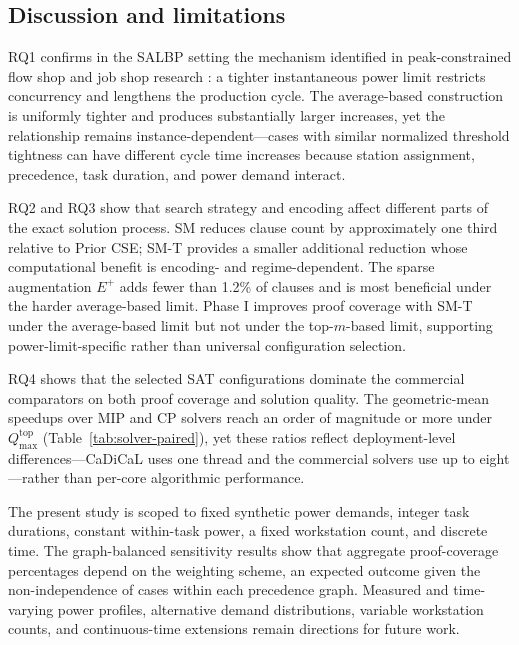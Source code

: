 \documentclass[]{interact}
\theoremstyle{plain}
\theoremstyle{definition}
\theoremstyle{remark}
\begin{document}


\FloatBarrier
\subsection{Discussion and limitations}

RQ1 confirms in the SALBP setting the mechanism identified in peak-constrained flow shop and job shop research \citep{Fang2013Flow,Carlucci2021A}: a tighter instantaneous power limit restricts concurrency and lengthens the production cycle. The average-based construction is uniformly tighter and produces substantially larger increases, yet the relationship remains instance-dependent---cases with similar normalized threshold tightness can have different cycle time increases because station assignment, precedence, task duration, and power demand interact.

RQ2 and RQ3 show that search strategy and encoding affect different parts of the exact solution process. SM reduces clause count by approximately one third relative to Prior CSE; SM-T provides a smaller additional reduction whose computational benefit is encoding- and regime-dependent. The sparse augmentation $E^+$ adds fewer than 1.2\% of clauses and is most beneficial under the harder average-based limit. Phase I improves proof coverage with SM-T under the average-based limit but not under the top-$m$-based limit, supporting power-limit-specific rather than universal configuration selection.

RQ4 shows that the selected SAT configurations dominate the commercial comparators on both proof coverage and solution quality. The geometric-mean speedups over MIP and CP solvers reach an order of magnitude or more under $Q_{\max}^{\mathrm{top}}$ (Table~\ref{tab:solver-paired}), yet these ratios reflect deployment-level differences---CaDiCaL uses one thread and the commercial solvers use up to eight---rather than per-core algorithmic performance.

The present study is scoped to fixed synthetic power demands, integer task durations, constant within-task power, a fixed workstation count, and discrete time. The graph-balanced sensitivity results show that aggregate proof-coverage percentages depend on the weighting scheme, an expected outcome given the non-independence of cases within each precedence graph. Measured and time-varying power profiles, alternative demand distributions, variable workstation counts, and continuous-time extensions remain directions for future work.
\end{document}
